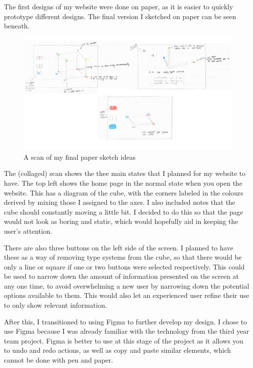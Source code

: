 \documentclass{l4proj}
\begin{document}
The first designs of my website were done on paper, as it is easier to quickly prototype different designs.  The final version I sketched on paper can be seen beneath.

\begin{figure}[h!]
    \centering
    \includegraphics[width=1\linewidth]{dissertation/images/paper_collaged_taller.png}
    \caption{A scan of my final paper sketch ideas}
    \label{fig:enter-label}
\end{figure}

The (collaged) scan shows the thee main states that I planned for my website to have.  The top left shows the home page in the normal state when you open the website.  This has a diagram of the cube, with the corners labeled in the colours derived by mixing those I assigned to the axes.  I also included notes that the cube should constantly moving a little bit.  I decided to do this so that the page would not look as boring and static, which would hopefully aid in keeping the user's attention.  

There are also three buttons on the left side of the screen.  I planned to have these as a way of removing type systems from the cube, so that there would be only a line or square if one or two buttons were selected respectively.  This could be used to narrow down the amount of information presented on the screen at any one time, to avoid overwhelming a new user by narrowing down the potential options available to them.  This would also let an experienced user refine their use to only show relevant information.

After this, I transitioned to using Figma to further develop my design.  I chose to use Figma because I was already familiar with the technology from the third year team project.  Figma is better to use at this stage of the project as it allows you to undo and redo actions, as well as copy and paste similar elements, which cannot be done with pen and paper.
\end{document}
